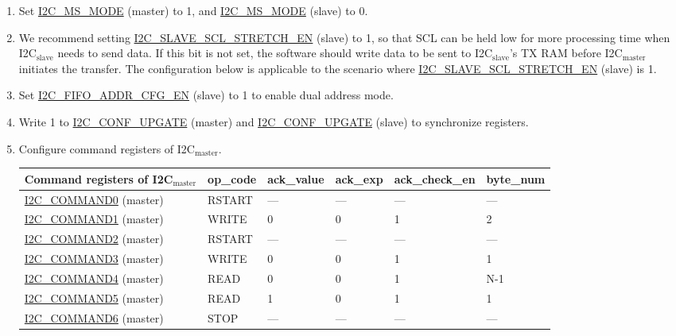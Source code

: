 \documentclass[main\_\_EN.tex]{subfiles}
\begin{document}
\begin{enumerate}
\item Set \hyperref[fielddesc:I2CMSMODE]{I2C\_MS\_MODE} (master) to 1, and \hyperref[fielddesc:I2CMSMODE]{I2C\_MS\_MODE} (slave) to 0.
\item We recommend setting \hyperref[fielddesc:I2CSLAVESCLSTRETCHEN]{I2C\_SLAVE\_SCL\_STRETCH\_EN} (slave) to 1, so that SCL can be held low for more processing time when I2C$_\text{slave}$ needs to send data. If this bit is not set, the software should write data to be sent to I2C$_\text{slave}$'s TX RAM before I2C$_\text{master}$ initiates the transfer. The configuration below is applicable to the scenario where \hyperref[fielddesc:I2CSLAVESCLSTRETCHEN]{I2C\_SLAVE\_SCL\_STRETCH\_EN} (slave) is 1.
\item Set \hyperref[fielddesc:I2CFIFOADDRCFGEN]{I2C\_FIFO\_ADDR\_CFG\_EN} (slave) to 1 to enable dual address mode.
\item Write 1 to \hyperref[fielddesc:I2CCONFUPGATE]{I2C\_CONF\_UPGATE} (master) and \hyperref[fielddesc:I2CCONFUPGATE]{I2C\_CONF\_UPGATE} (slave) to synchronize registers.
\item Configure command registers of I2C$_\text{master}$.

\begin{longtable}{ | p{5cm} | p{1.5cm} | p{1.5cm} | p{1.5cm} |p{2.5cm} | p{1.5cm} |}
\hline\rowcolor{lightgray}
Command registers of I2C$_\text{master}$& op\_code & ack\_value&ack\_exp&ack\_check\_en&byte\_num  \\ \hline
\hyperref[fielddesc:I2CCOMMAND0]{I2C\_COMMAND0} (master)& RSTART& ---&---&---&---  \\ \hline
\hyperref[fielddesc:I2CCOMMAND1]{I2C\_COMMAND1} (master)& WRITE& 0&0&1&2  \\ \hline
\hyperref[fielddesc:I2CCOMMAND2]{I2C\_COMMAND2} (master)& RSTART& ---&---&---&---  \\ \hline
\hyperref[fielddesc:I2CCOMMAND3]{I2C\_COMMAND3} (master)& WRITE& 0&0&1&1  \\ \hline
\hyperref[fielddesc:I2CCOMMAND4]{I2C\_COMMAND4} (master)& READ& 0&0&1&N-1  \\ \hline
\hyperref[fielddesc:I2CCOMMAND5]{I2C\_COMMAND5} (master)& READ& 1&0&1&1  \\ \hline
\hyperref[fielddesc:I2CCOMMAND6]{I2C\_COMMAND6} (master)& STOP& ---&---&---&---  \\ \hline
\end{longtable}


\end{enumerate}
\end{document}
